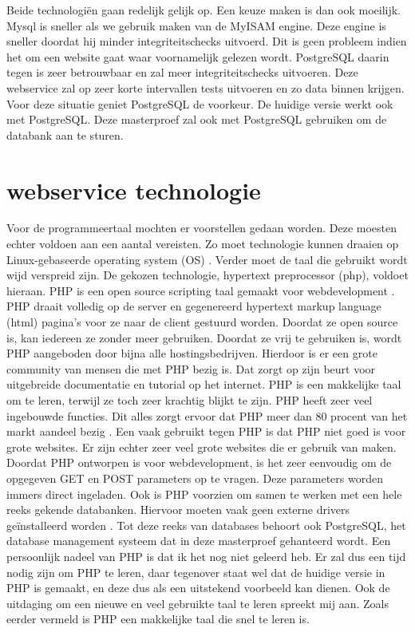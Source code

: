 \npar
Beide technologi\"en gaan redelijk gelijk op. Een keuze maken is dan ook moeilijk. 
Mysql is sneller als we gebruik maken van de MyISAM engine. Deze engine is sneller doordat hij minder integriteitschecks uitvoerd. Dit is geen probleem indien het om een website gaat waar voornamelijk gelezen wordt. PostgreSQL daarin tegen is zeer betrouwbaar en zal meer integriteitschecks uitvoeren. Deze webservice zal op zeer korte intervallen tests uitvoeren en zo data binnen krijgen. Voor deze situatie geniet PostgreSQL de voorkeur. De huidige versie werkt ook met PostgreSQL. Deze masterproef zal ook met PostgreSQL gebruiken om de databank aan te sturen.
 
\section{webservice technologie}
\npar
Voor de programmeertaal mochten er voorstellen gedaan worden. Deze moesten echter voldoen aan een aantal vereisten. Zo moet technologie kunnen draaien op Linux-gebaseerde operating system (OS) . Verder moet de taal die gebruikt wordt wijd verspreid zijn.
\npar
De gekozen technologie, hypertext preprocessor (php), voldoet hieraan. PHP is een open source scripting taal gemaakt voor webdevelopment \citep{php-what}. PHP draait volledig op de server en gegenereerd hypertext markup language (html)  pagina's voor ze naar de client gestuurd worden. Doordat ze open source is, kan iedereen ze zonder meer gebruiken. Doordat ze vrij te gebruiken is, wordt PHP aangeboden door bijna alle hostingsbedrijven. Hierdoor is er een grote community van mensen die met PHP bezig is. Dat zorgt op zijn beurt voor uitgebreide documentatie en tutorial op het internet. PHP is een makkelijke taal om te leren, terwijl ze toch zeer krachtig blijkt te zijn. PHP heeft zeer veel ingebouwde functies. Dit alles zorgt ervoor dat PHP meer dan 80 procent van het markt aandeel bezig \citep{php-market}. Een vaak gebruikt tegen PHP is dat PHP niet goed is voor grote websites. Er zijn echter zeer veel grote websites die er gebruik van maken\citep{php-big-sites}.
\npar
Doordat PHP ontworpen is voor webdevelopment, is het zeer eenvoudig om de opgegeven GET en POST parameters op te vragen. Deze parameters worden immers direct ingeladen. Ook is PHP voorzien om samen te werken met een hele reeks gekende databanken. Hiervoor moeten vaak geen externe drivers ge\"installeerd worden \citep{php-databases}. Tot deze reeks van databases behoort ook PostgreSQL, het database management systeem dat in deze masterproef gehanteerd wordt. 
\npar
Een persoonlijk nadeel van PHP is dat ik het nog niet geleerd heb. Er zal dus een tijd nodig zijn om PHP te leren, daar tegenover staat wel dat de huidige versie in PHP is gemaakt, en deze dus als een uitstekend voorbeeld kan dienen. Ook de uitdaging om een nieuwe en veel gebruikte taal te leren spreekt mij aan.
Zoals eerder vermeld is PHP een makkelijke taal die snel te leren is.
